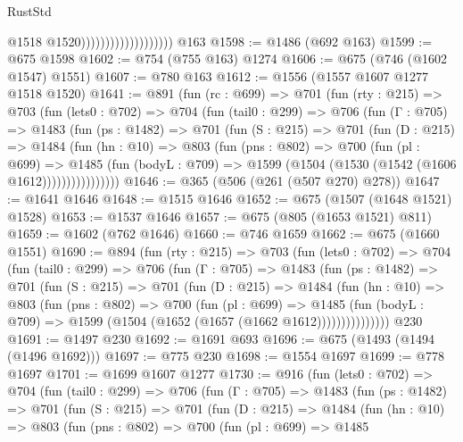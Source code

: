 \begin{lexlean}{RustStd}
\begin{coremodule}
                                          @1518
                                          @1520)))))))))))))))))))
    @163
@1598 := @1486 (@692 @163)
@1599 := @675 @1598
@1602 := @754 (@755 @163) @1274
@1606 := @675 (@746 (@1602 @1547) @1551)
@1607 := @780 @163
@1612 := @1556 (@1557 @1607 @1277 @1518 @1520)
@1641 := @891
    (fun (rc : @699) =>
    @701
      (fun (rty : @215) =>
      @703
        (fun (lets0 : @702) =>
        @704
          (fun (tail0 : @299) =>
          @706
            (fun (Γ : @705) =>
            @1483
              (fun (ps : @1482) =>
              @701
                (fun (S : @215) =>
                @701
                  (fun (D : @215) =>
                  @1484
                    (fun (hn : @10) =>
                    @803
                      (fun (pns : @802) =>
                      @700
                        (fun (pl : @699) =>
                        @1485
                          (fun (bodyL : @709) =>
                          @1599 (@1504 (@1530 (@1542 (@1606 @1612))))))))))))))))
@1646 := @365 (@506 (@261 (@507 @270) @278))
@1647 := @1641 @1646
@1648 := @1515 @1646
@1652 := @675 (@1507 (@1648 @1521) @1528)
@1653 := @1537 @1646
@1657 := @675 (@805 (@1653 @1521) @811)
@1659 := @1602 (@762 @1646)
@1660 := @746 @1659
@1662 := @675 (@1660 @1551)
@1690 := @894
    (fun (rty : @215) =>
    @703
      (fun (lets0 : @702) =>
      @704
        (fun (tail0 : @299) =>
        @706
          (fun (Γ : @705) =>
          @1483
            (fun (ps : @1482) =>
            @701
              (fun (S : @215) =>
              @701
                (fun (D : @215) =>
                @1484
                  (fun (hn : @10) =>
                  @803
                    (fun (pns : @802) =>
                    @700
                      (fun (pl : @699) =>
                      @1485
                        (fun (bodyL : @709) =>
                        @1599 (@1504 (@1652 (@1657 (@1662 @1612)))))))))))))))
    @230
@1691 := @1497 @230
@1692 := @1691 @693
@1696 := @675 (@1493 (@1494 (@1496 @1692)))
@1697 := @775 @230
@1698 := @1554 @1697
@1699 := @778 @1697
@1701 := @1699 @1607 @1277
@1730 := @916
    (fun (lets0 : @702) =>
    @704
      (fun (tail0 : @299) =>
      @706
        (fun (Γ : @705) =>
        @1483
          (fun (ps : @1482) =>
          @701
            (fun (S : @215) =>
            @701
              (fun (D : @215) =>
              @1484
                (fun (hn : @10) =>
                @803
                  (fun (pns : @802) =>
                  @700
                    (fun (pl : @699) =>
                    @1485

\end{coremodule}
\end{lexlean}
